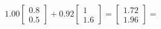 \documentclass[preview]{standalone}
\begin{document}
\begin{align*}
1.00 \begin{bmatrix} 0.8 \\ 0.5 \end{bmatrix} + 0.92 \begin{bmatrix} 1 \\ 1.6 \end{bmatrix} = \begin{bmatrix} 1.72 \\ 1.96 \end{bmatrix} =
\end{align*}
\end{document}
